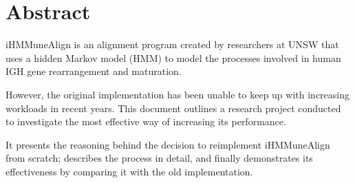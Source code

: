 \chapter*{Abstract}\label{abstract}
iHMMuneAlign is an alignment program created by researchers at UNSW that uses a hidden Markov model (HMM) to model the processes involved in human IGH gene rearrangement and maturation.

However, the original implementation has been unable to keep up with increasing workloads in recent years. This document outlines a research project conducted to investigate the most effective way of increasing its performance.

It presents the reasoning behind the decision to reimplement iHMMuneAlign from scratch; describes the process in detail, and finally demonstrates its effectiveness by comparing it with the old implementation.
